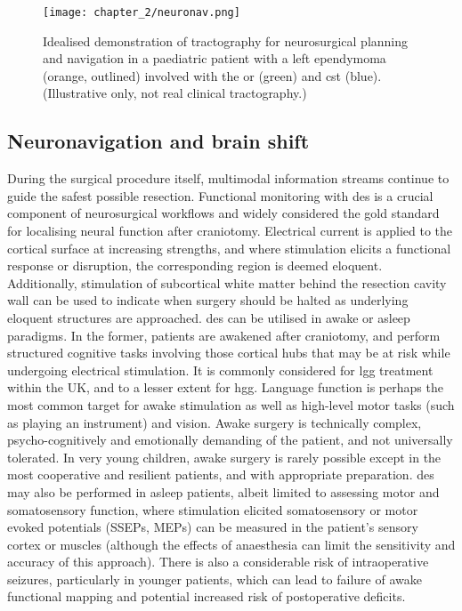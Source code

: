 \begin{SCfigure}[][htb!]
  \texttt{[image: chapter\_2/neuronav.png]}
  \caption{Idealised demonstration of tractography for neurosurgical planning and navigation in a paediatric patient with a left ependymoma (orange, outlined) involved with the \gls{or} (green) and \gls{cst} (blue). (Illustrative only, not real clinical tractography.)}
  \label{fig:nav}
\end{SCfigure}

\subsection{Neuronavigation and brain shift}

During the surgical procedure itself, multimodal information streams continue to guide the safest possible resection.
Functional monitoring with \gls{des} is a crucial component of neurosurgical workflows and widely considered the gold standard for localising neural function after craniotomy.
Electrical current is applied to the cortical surface at increasing strengths\autocite{Saito2015}, and where stimulation elicits a functional response or disruption, the corresponding region is deemed eloquent.
Additionally, stimulation of subcortical white matter behind the resection cavity wall can be used to indicate when surgery should be halted as underlying eloquent structures are approached\autocite{Sala2019}.
\gls{des} can be utilised in awake or asleep paradigms.
In the former, patients are awakened after craniotomy, and perform structured cognitive tasks involving those cortical hubs that may be at risk while undergoing electrical stimulation.
It is commonly considered for \gls{lgg} treatment within the UK, and to a lesser extent for \gls{hgg}\autocite{WykesV.2017}.
Language function is perhaps the most common target for awake stimulation as well as high-level motor tasks (such as playing an instrument) and vision\autocite{Mazerand2017}.
Awake surgery is technically complex, psycho-cognitively and emotionally demanding of the patient, and not universally tolerated\autocite{Nossek2013a,Wang2019}.
In very young children, awake surgery is rarely possible except in the most cooperative and resilient patients, and with appropriate preparation\autocite{Zolotova2022}.
\gls{des} may also be performed in asleep patients, albeit limited to assessing motor and somatosensory function, where stimulation elicited somatosensory or motor evoked potentials (SSEPs, MEPs) can be measured in the patient's sensory cortex or muscles\autocite{Stone2019} (although the effects of anaesthesia can limit the sensitivity and accuracy of this approach\autocite{Stone2019,WeissLucas2020}).
There is also a considerable risk of intraoperative seizures, particularly in younger patients, which can lead to failure of awake functional mapping and potential increased risk of postoperative deficits\autocite{Nossek2013,Wang2019,Rigolo2020a}.

